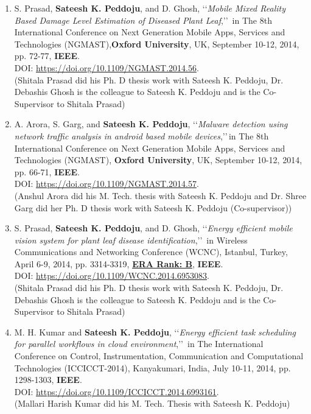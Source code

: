 \begin{enumerate}
	
	\item
	S. Prasad, \textbf{Sateesh K. Peddoju}, and D. Ghosh, \lq\lq \textit{Mobile Mixed Reality Based Damage Level Estimation of Diseased Plant Leaf},\rq\rq\, in The 8th International Conference on Next Generation Mobile Apps, Services and Technologies (NGMAST),\textbf{Oxford University}, UK, September 10-12, 2014, pp. 72-77, \textbf{IEEE}. \\DOI: \url{https://doi.org/10.1109/NGMAST.2014.56}. \\(Shitala Prasad did his Ph. D thesis work with Sateesh K. Peddoju, Dr. Debashis Ghosh is the colleague to Sateesh K. Peddoju and is the Co-Supervisor to Shitala Prasad)

		
	\item
	A. Arora, S. Garg, and \textbf{Sateesh K. Peddoju}, \lq\lq \textit{Malware detection using network traffic analysis in android based mobile devices},\rq\rq\,in The 8th International Conference on Next Generation Mobile Apps, Services and Technologies (NGMAST), \textbf{Oxford University}, UK, September 10-12, 2014, pp. 66-71, \textbf{IEEE}. \\DOI: \url{https://doi.org/10.1109/NGMAST.2014.57}. \\ (Anshul Arora did his  M. Tech. thesis with Sateesh K. Peddoju and Dr. Shree Garg did her Ph. D thesis work with Sateesh K. Peddoju (Co-supervisor))

	
	\item
	S. Prasad, \textbf{Sateesh K. Peddoju}, and D. Ghosh, \lq\lq \textit{Energy efficient mobile vision system for plant leaf disease identification},\rq\rq\, in Wireless Communications and Networking Conference (WCNC), Istanbul, Turkey, April 6-9, 2014, pp. 3314-3319, \underline{\textbf{ERA Rank: B}}, \textbf{IEEE}. \\DOI: \url{https://doi.org/10.1109/WCNC.2014.6953083}. \\(Shitala Prasad did his Ph. D thesis work with Sateesh K. Peddoju, Dr. Debashis Ghosh is the colleague to Sateesh K. Peddoju and is the Co-Supervisor to Shitala Prasad)

	
	\item
	M. H. Kumar and \textbf{Sateesh K. Peddoju}, \lq\lq \textit{Energy efficient task scheduling for parallel workflows in cloud environment},\rq\rq\, in The International Conference on Control, Instrumentation, Communication and Computational Technologies (ICCICCT-2014), Kanyakumari, India, July 10-11, 2014, pp. 1298-1303, \textbf{IEEE}. 
\\DOI: \url{https://doi.org/10.1109/ICCICCT.2014.6993161}. \\(Mallari Harish Kumar did his M. Tech. Thesis with Sateesh K. Peddoju)
	

\end{enumerate}
